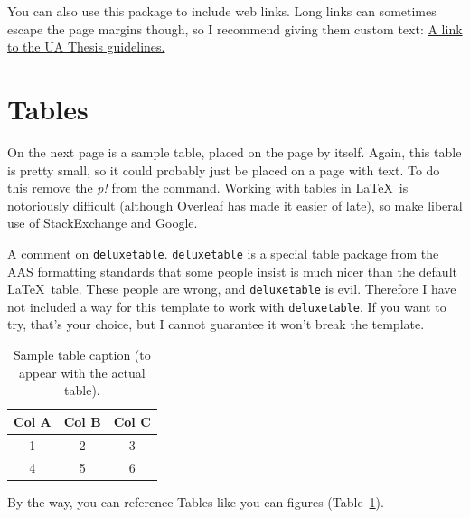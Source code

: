You can also use this package to include web links. Long links can sometimes escape the page margins though, so I recommend
giving them custom text: \href{https://grad.arizona.edu/gsas/dissertations-theses/dissertation-and-thesis-formatting-guides}
{A link to the UA Thesis guidelines.}

\section{Tables}
On the next page is a sample table, placed on the page by itself. Again, this table is pretty small, so it could 
probably just be placed on a page with text. To do this remove the \emph{p!} from the command. Working with tables in
\LaTeX\ is notoriously difficult (although Overleaf has made it easier of late), so make liberal use of StackExchange 
and Google. 

A comment on \texttt{deluxetable}. \texttt{deluxetable} is a special table package from the AAS formatting standards that
some people insist is much nicer than the default \LaTeX\ table. These people are wrong, and \texttt{deluxetable} is evil.
Therefore I have not included a way for this template to work with \texttt{deluxetable}. If you want to try, that's your
choice, but I cannot guarantee it won't break the template.

\begin{table}[p!]
\begin{center}
\caption[Short table caption for LOT]{Sample table caption (to appear with the actual table). \label{sampletable}}
\vspace{0.3in}
\begin{tabular}{ccc}
\hline 
\hline
Col A & Col B & Col C \\
\hline
1 & 2 & 3 \\
4 & 5 & 6\\
\hline
\end{tabular}
\end{center}
\end{table}

By the way, you can reference Tables like you can figures (Table~\ref{sampletable}).